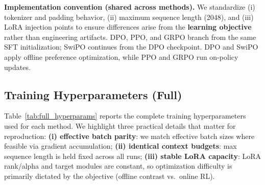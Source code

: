 \begin{table}[ht!]
\centering
\normalsize
\renewcommand{\arraystretch}{1.2}
\caption{\textbf{Hardware and software configuration.} We use TRL for consistent implementations of policy optimization and preference learning. Optuna with TPE is used for systematic hyperparameter search.}
\label{tab:hardware}
\end{table}

\vspace{-0.35em}
\noindent\textbf{Implementation convention (shared across methods).}
We standardize (i) tokenizer and padding behavior, (ii) maximum sequence length (2048), and (iii) LoRA injection points to ensure differences arise from the \textbf{learning objective} rather than engineering artifacts.
DPO, PPO, and GRPO branch from the same SFT initialization; SwiPO continues from the DPO checkpoint. DPO and SwiPO apply offline preference optimization, while PPO and GRPO run on-policy updates.

\subsection{Training Hyperparameters (Full)}

\vspace{-0.25em}
\noindent
Table~\ref{tab:full_hyperparams} reports the complete training hyperparameters used for each method.
We highlight three practical details that matter for reproduction:
\textbf{(i) effective batch parity}: we match effective batch sizes where feasible via gradient accumulation;
\textbf{(ii) identical context budgets}: max sequence length is held fixed across all runs;
\textbf{(iii) stable LoRA capacity}: LoRA rank/alpha and target modules are constant, so optimization difficulty is primarily dictated by the objective (offline contrast vs.\ online RL).

